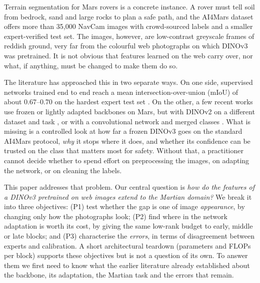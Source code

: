 \documentclass[conference]{IEEEtran}
\begin{document}
Terrain segmentation for Mars rovers is a concrete instance. A rover must tell soil from bedrock, sand and large rocks to plan a safe path, and the AI4Mars dataset \cite{swan2021ai4mars} offers more than 35{,}000 NavCam images with crowd-sourced labels and a smaller expert-verified test set. The images, however, are low-contrast greyscale frames of reddish ground, very far from the colourful web photographs on which DINOv3 was pretrained. It is not obvious that features learned on the web carry over, nor what, if anything, must be changed to make them do so.

The literature has approached this in two separate ways. On one side, supervised networks trained end to end reach a mean intersection-over-union (mIoU) of about 0.67--0.70 on the hardest expert test set \cite{mohammad2025}. On the other, a few recent works use frozen or lightly adapted backbones on Mars, but with DINOv2 on a different dataset and task \cite{durai2026mantle}, or with a convolutional network and merged classes \cite{dai2026marsunet}. What is missing is a controlled look at how far a frozen DINOv3 goes on the standard AI4Mars protocol, \emph{why} it stops where it does, and whether its confidence can be trusted on the class that matters most for safety. Without that, a practitioner cannot decide whether to spend effort on preprocessing the images, on adapting the network, or on cleaning the labels.

This paper addresses that problem. Our central question is \emph{how do the features of a DINOv3 pretrained on web images extend to the Martian domain?} We break it into three objectives: (P1) test whether the gap is one of image \emph{appearance}, by changing only how the photographs look; (P2) find where in the network adaptation is worth its cost, by giving the same low-rank budget to early, middle or late blocks; and (P3) characterise the \emph{errors}, in terms of disagreement between experts and calibration. A short architectural teardown (parameters and FLOPs per block) supports these objectives but is not a question of its own. To answer them we first need to know what the earlier literature already established about the backbone, its adaptation, the Martian task and the errors that remain.
\end{document}
